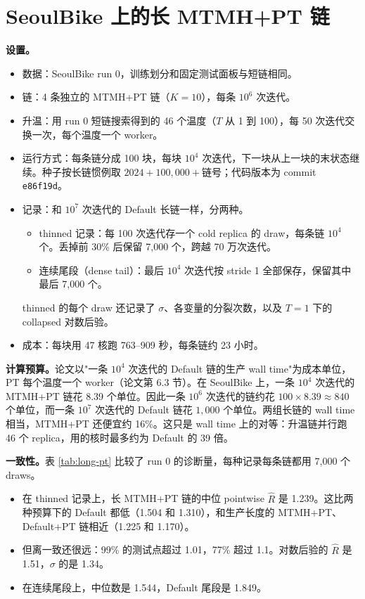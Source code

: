 \documentclass[11pt]{article}
\newcommand{\Rhat}{\hat R}
\begin{document}
\section{SeoulBike 上的长 MTMH+PT 链}
\label{sec:long-pt}
\textbf{设置。}
\begin{itemize}
\item 数据：SeoulBike run 0，训练划分和固定测试面板与短链相同。
\item 链：4 条独立的 MTMH+PT 链（$K=10$），每条 $10^6$ 次迭代。
\item 升温：用 run 0 短链搜索得到的 46 个温度（$T$ 从 1 到 100），每 50 次迭代交换一次，每个温度一个 worker。
\item 运行方式：每条链分成 100 块，每块 $10^4$ 次迭代，下一块从上一块的末状态继续。种子按长链惯例取 $2024+100{,}000+\text{链号}$；代码版本为 commit \texttt{e86f19d}。
\item 记录：和 $10^7$ 次迭代的 Default 长链一样，分两种。
\begin{itemize}
\item thinned 记录：每 100 次迭代存一个 cold replica 的 draw，每条链 $10^4$ 个。丢掉前 30\% 后保留 7,000 个，跨越 70 万次迭代。
\item 连续尾段（dense tail）：最后 $10^4$ 次迭代按 stride 1 全部保存，保留其中最后 7,000 个。
\end{itemize}
thinned 的每个 draw 还记录了 $\sigma$、各变量的分裂次数，以及 $T=1$ 下的 collapsed 对数后验。
\item 成本：每块用 47 核跑 763--909 秒，每条链约 23 小时。
\end{itemize}

\textbf{计算预算。}论文以"一条 $10^4$ 次迭代的 Default 链的生产 wall time"为成本单位，PT 每个温度一个 worker（论文第 6.3 节）。在 SeoulBike 上，一条 $10^4$ 次迭代的 MTMH+PT 链花 8.39 个单位。因此一条 $10^6$ 次迭代的链约花 $100\times8.39\approx840$ 个单位，而一条 $10^7$ 次迭代的 Default 链花 $1{,}000$ 个单位。两组长链的 wall time 相当，MTMH+PT 还便宜约 16\%。这只是 wall time 上的对等：升温链并行跑 46 个 replica，用的核时最多约为 Default 的 39 倍。

\textbf{一致性。}表 \ref{tab:long-pt} 比较了 run 0 的诊断量，每种记录每条链都用 7,000 个 draws。
\begin{itemize}
\item 在 thinned 记录上，长 MTMH+PT 链的中位 pointwise $\Rhat$ 是 1.239。这比两种预算下的 Default 都低（1.504 和 1.310），和生产长度的 MTMH+PT、Default+PT 链相近（1.225 和 1.170）。
\item 但离一致还很远：99\% 的测试点超过 1.01，77\% 超过 1.1。对数后验的 $\Rhat$ 是 1.51，$\sigma$ 的是 1.34。
\item 在连续尾段上，中位数是 1.544，Default 尾段是 1.849。
\end{itemize}
\end{document}
